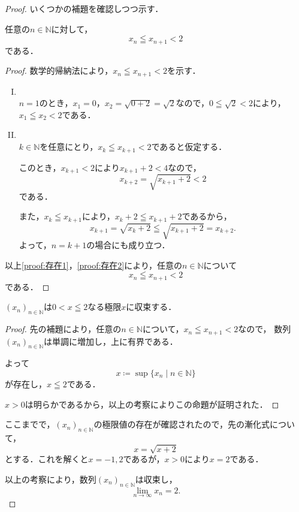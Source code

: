 \documentclass[a4paper,11pt]{ltjsarticle}
\newenvironment{tleftbar}{\begin{tbleftline}\setlength{\parindent}{1\zw}}{\end{tbleftline}}
\newenvironment{dotleftbar}{%
  \begin{tbdotleftline}\setlength{\parindent}{1\zw}%
}{%
  \end{tbdotleftline}%
}
\begin{document}
\begin{tleftbar}
  \begin{proof}
    いくつかの補題を確認しつつ示す．
\begin{lemma}{}{}
  任意の$n \in \mathbb{N}$に対して，
  \[
  x_n \leqq x_{n+1} < 2
  \]
  である．
\end{lemma}

\begin{dotleftbar}
\begin{proof}
  数学的帰納法により，$x_n \leqq x_{n+1} < 2$を示す．
  \begin{enumerate}[(I)]
    \item \mbox{} \\ \label{proof:存在1}
    $n=1$のとき，$ x_1 =0$，$x_2= \sqrt{0+2}=\sqrt{2}$なので，$ 0 \leqq \sqrt{2} < 2$により，
    $x_1 \leqq x_2 < 2$である．
    \item \mbox{} \\ \label{proof:存在2}
    $k \in \mathbb{N}$を任意にとり，$x_k \leqq x_{k+1} < 2$であると仮定する．

    このとき，$x_{k+1} < 2$により$ x_{k+1}+2 < 4$なので，
    \[
    x_{k+2}=\sqrt{x_{k+1} + 2} < 2
    \]
    である．

    また，$x_k \leqq x_{k+1}$により，$x_k +2  \leqq x_{k+1}+2$であるから，
    \[
    x_{k+1}= \sqrt{x_k +2} \leqq \sqrt{x_{k+1}+2}=x_{k+2}.
    \]
    よって，$n=k+1$の場合にも成り立つ．
  \end{enumerate}
  以上\ref{proof:存在1}，\ref{proof:存在2}により，任意の$n \in \mathbb{N}$について
  \[
  x_n \leqq x_{n+1} < 2
  \]
  である．
\end{proof}
\end{dotleftbar}

\begin{lemma}{}{}
  $(x_n)_{n \in \mathbb{N}}$は$ 0<  x \leqq 2$なる極限$x$に収束する．
\end{lemma}

\begin{dotleftbar}
\begin{proof}
先の補題により，任意の$n \in \mathbb{N}$について，$ x_n \leqq x_{n+1} <2$なので，
数列$(x_n)_{n \in \mathbb{N}}$は単調に増加し，上に有界である．

よって
\[
x \coloneqq \sup \{ x_n \mid n \in \mathbb{N} \}
\]
が存在し，$x \leqq  2$である．

$ x>0$は明らかであるから，以上の考察によりこの命題が証明された．
\end{proof}
\end{dotleftbar}

ここまでで，$(x_n)_{n \in \mathbb{N}}$の極限値の存在が確認されたので，先の漸化式について，
\[
x=\sqrt{x+2}
\]
とする．これを解くと$ x= -1,2$であるが，$x>0$により$x=2$である．

以上の考察により，数列$(x_n)_{n \in \mathbb{N}}$は収束し，
\[
\lim_{n \to \infty} x_n =2.
\]
\end{proof}
\end{tleftbar}
\end{document}
